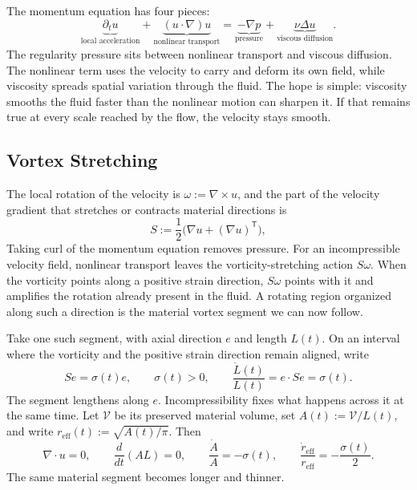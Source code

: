 
The momentum equation has four pieces:
\[
  \underbrace{\partial_t u}_{\text{local acceleration}}
  +
  \underbrace{(u\cdot\nabla)u}_{\text{nonlinear transport}}
  =
  \underbrace{-\nabla p}_{\text{pressure}}
  +
  \underbrace{\nu\Delta u}_{\text{viscous diffusion}}.
\]
The regularity pressure sits between nonlinear transport and viscous diffusion.
The nonlinear term uses the velocity to carry and deform its own field, while viscosity spreads spatial variation through the fluid.
The hope is simple: viscosity smooths the fluid faster than the nonlinear motion can sharpen it.
If that remains true at every scale reached by the flow, the velocity stays smooth.

\subsection{Vortex Stretching}\label{sub:ThePerfectlyStretchingVortex}

The local rotation of the velocity is \(\omega:=\nabla\times u\), and the part of the velocity gradient that stretches or contracts material directions is
\[
  S:=\frac12\bigl(\nabla u+(\nabla u)^{\mathsf T}\bigr),
\]
Taking curl of the momentum equation removes pressure.
For an incompressible velocity field, nonlinear transport leaves the vorticity-stretching action \(S\omega\).
When the vorticity points along a positive strain direction, \(S\omega\) points with it and amplifies the rotation already present in the fluid.
A rotating region organized along such a direction is the material vortex segment we can now follow.

Take one such segment, with axial direction \(e\) and length \(L(t)\).
On an interval where the vorticity and the positive strain direction remain aligned, write
\[
  Se=\sigma(t)e,
  \qquad
  \sigma(t)>0,
  \qquad
  \frac{\dot L(t)}{L(t)}
  =
  e\cdot Se
  =
  \sigma(t).
\]
The segment lengthens along \(e\).
Incompressibility fixes what happens across it at the same time.
Let \(\mathcal V\) be its preserved material volume, set \(A(t):=\mathcal V/L(t)\), and write \(r_{\mathrm{eff}}(t):=\sqrt{A(t)/\pi}\).
Then
\[
  \nabla\cdot u=0,
  \qquad
  \frac{d}{dt}(A L)=0,
  \qquad
  \frac{\dot A}{A}=-\sigma(t),
  \qquad
  \frac{\dot r_{\mathrm{eff}}}{r_{\mathrm{eff}}}
  =
  -\frac{\sigma(t)}{2}.
\]
The same material segment becomes longer and thinner.

